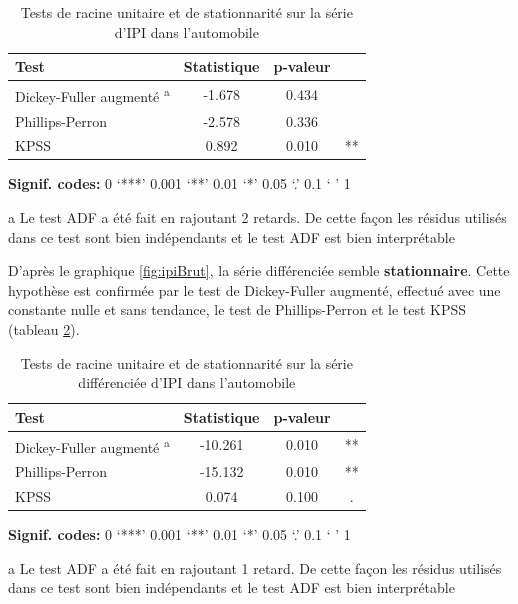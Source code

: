 \documentclass[]{article}
\begin{document}
\begin{table}[!h]

\caption{\label{tab:tabTestsInit}Tests de racine unitaire et de stationnarité sur la série d'IPI dans l'automobile}
\centering
\begin{threeparttable}
\begin{tabular}[t]{lccc}
\toprule
Test & Statistique & p-valeur & \\
\midrule
Dickey-Fuller augmenté \textsuperscript{a} & -1.678 & 0.434 & \\
Phillips-Perron & -2.578 & 0.336 & \\
KPSS & 0.892 & 0.010 & **\\
\bottomrule
\end{tabular}
\begin{tablenotes}
\item \hspace{-0.4cm}\textbf{Signif. codes: }0 `***' 0.001 `**' 0.01 `*' 0.05 `.' 0.1 ` ' 1
\item[a] Le test ADF a été fait en rajoutant 2 retards. De cette façon les résidus utilisés dans ce test sont bien indépendants et le test ADF est bien interprétable
\end{tablenotes}
\end{threeparttable}
\end{table}

D'après le graphique \ref{fig:ipiBrut}, la série différenciée semble \textbf{stationnaire}.
Cette hypothèse est confirmée par le test de Dickey-Fuller augmenté, effectué avec une constante nulle et sans tendance, le test de Phillips-Perron et le test KPSS (tableau \ref{tab:tabTestsDiff}).

\begin{table}[!h]

\caption{\label{tab:tabTestsDiff}Tests de racine unitaire et de stationnarité sur la série différenciée d'IPI dans l'automobile}
\centering
\begin{threeparttable}
\begin{tabular}[t]{lccc}
\toprule
Test & Statistique & p-valeur & \\
\midrule
Dickey-Fuller augmenté \textsuperscript{a} & -10.261 & 0.010 & **\\
Phillips-Perron & -15.132 & 0.010 & **\\
KPSS & 0.074 & 0.100 & .\\
\bottomrule
\end{tabular}
\begin{tablenotes}
\item \hspace{-0.4cm}\textbf{Signif. codes: }0 `***' 0.001 `**' 0.01 `*' 0.05 `.' 0.1 ` ' 1
\item[a] Le test ADF a été fait en rajoutant 1 retard. De cette façon les résidus utilisés dans ce test sont bien indépendants et le test ADF est bien interprétable
\end{tablenotes}
\end{threeparttable}
\end{table}
\end{document}
